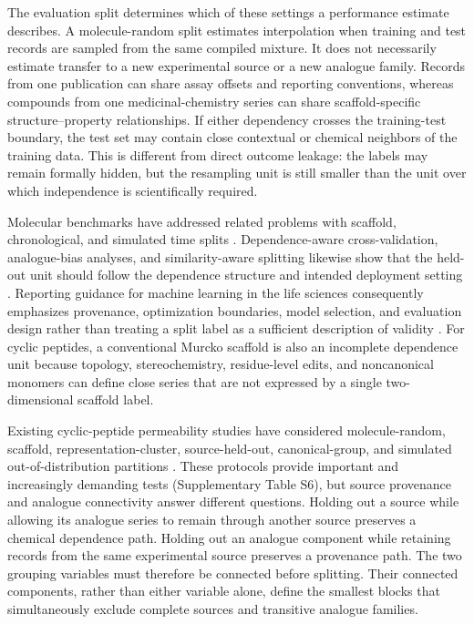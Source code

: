\documentclass[referee,lineno,pdflatex,Numbered,sn-basic]{sn-jnl}
\begin{document}
The evaluation split determines which of these settings a performance estimate describes. A molecule-random split estimates interpolation when training and test records are sampled from the same compiled mixture. It does not necessarily estimate transfer to a new experimental source or a new analogue family. Records from one publication can share assay offsets and reporting conventions, whereas compounds from one medicinal-chemistry series can share scaffold-specific structure--property relationships. If either dependency crosses the training-test boundary, the test set may contain close contextual or chemical neighbors of the training data. This is different from direct outcome leakage: the labels may remain formally hidden, but the resampling unit is still smaller than the unit over which independence is scientifically required.

Molecular benchmarks have addressed related problems with scaffold, chronological, and simulated time splits \cite{wu2018moleculenet,yang2019representations,sheridan2013timesplit,landrum2023simpd}. Dependence-aware cross-validation, analogue-bias analyses, and similarity-aware splitting likewise show that the held-out unit should follow the dependence structure and intended deployment setting \cite{roberts2017crossvalidation,wallach2018analogue,kalinina2025datasail}. Reporting guidance for machine learning in the life sciences consequently emphasizes provenance, optimization boundaries, model selection, and evaluation design rather than treating a split label as a sufficient description of validity \cite{walsh2021dome}. For cyclic peptides, a conventional Murcko scaffold is also an incomplete dependence unit because topology, stereochemistry, residue-level edits, and noncanonical monomers can define close series that are not expressed by a single two-dimensional scaffold label.

Existing cyclic-peptide permeability studies have considered molecule-random, scaffold, representation-cluster, source-held-out, canonical-group, and simulated out-of-distribution partitions \cite{geyland2024applicability,liu2025benchmark,feller2025peptideclm,wang2025multicycpermea}. These protocols provide important and increasingly demanding tests (Supplementary Table S6), but source provenance and analogue connectivity answer different questions. Holding out a source while allowing its analogue series to remain through another source preserves a chemical dependence path. Holding out an analogue component while retaining records from the same experimental source preserves a provenance path. The two grouping variables must therefore be connected before splitting. Their connected components, rather than either variable alone, define the smallest blocks that simultaneously exclude complete sources and transitive analogue families.
\end{document}
